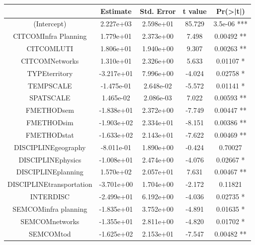 {\centering
\begin{tabular}{|c|c|c|c|c|}
\hline
                       &    Estimate & Std. Error & t value & Pr(>|t|)    \\\hline
(Intercept)            &   2.227e+03 & 2.598e+01 & 85.729 & 3.5e-06 *** \\
CITCOMInfra Planning   &   1.779e+01 & 2.373e+00  & 7.498 & 0.00492 ** \\
CITCOMLUTI             &   1.806e+01 & 1.940e+00 &  9.307 & 0.00263 ** \\
CITCOMNetworks         &   1.310e+01 & 2.326e+00 &  5.633 & 0.01107 *  \\
TYPEterritory          &  -3.217e+01 & 7.996e+00 & -4.024 & 0.02758 *  \\
TEMPSCALE              &  -1.475e-01 & 2.648e-02 & -5.572 & 0.01141 *  \\
SPATSCALE              &   1.465e-02 & 2.086e-03 &  7.022 & 0.00593 ** \\
FMETHODsem             &  -1.838e+01 & 2.372e+00 & -7.749 & 0.00447 ** \\
FMETHODsim             &  -1.903e+02 & 2.334e+01 & -8.151 & 0.00386 ** \\
FMETHODstat            &  -1.633e+02 & 2.143e+01 & -7.622 & 0.00469 ** \\
DISCIPLINEgeography    &  -8.011e-01 & 1.890e+00 & -0.424 & 0.70027    \\
DISCIPLINEphysics      &  -1.008e+01 & 2.474e+00 & -4.076 & 0.02667 *  \\
DISCIPLINEplanning     &   1.570e+02 & 2.057e+01 &  7.631 & 0.00467 ** \\
DISCIPLINEtransportation & -3.701e+00 & 1.704e+00 & -2.172 & 0.11821    \\
INTERDISC              &  -2.499e+01 & 6.192e+00 & -4.036 & 0.02735 *  \\
SEMCOMinfra planning   &  -1.835e+01 & 3.752e+00 & -4.891 & 0.01635 *  \\
SEMCOMnetworks         &  -1.355e+01 & 2.811e+00 & -4.820 & 0.01702 *  \\
SEMCOMtod              &  -1.625e+02 & 2.153e+01 & -7.547 & 0.00482 ** \\\hline
\end{tabular}
}












